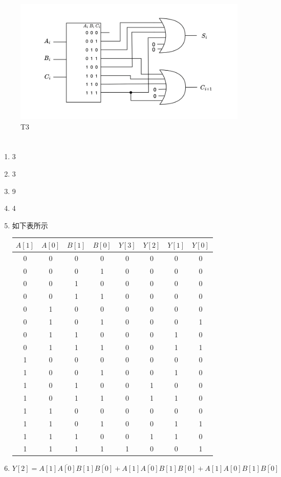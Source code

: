 \documentclass[UTF8]{ctexart}
\begin{document}
\section{}  %
\begin{figure}[h]
  \centering
  \includegraphics[scale=0.3]{p2.png}
  \caption{T3}
\end{figure}
\section{}  %
\begin{enumerate}
  \item 3
  \item 3
  \item 9
  \item 4
  \item 如下表所示
\begin{table}[H]\centering
  \begin{tabular}{cccc|cccc}
    \hline\hline
    $A[1]$ & $A[0]$ & $B[1]$ & $B[0]$ & $Y[3]$ & $Y[2]$ & $Y[1]$ & $Y[0]$ \\
    \hline
    0 & 0 & 0 & 0 & 0 & 0 & 0 & 0 \\
    0 & 0 & 0 & 1 & 0 & 0 & 0 & 0 \\
    0 & 0 & 1 & 0 & 0 & 0 & 0 & 0 \\
    0 & 0 & 1 & 1 & 0 & 0 & 0 & 0 \\
    0 & 1 & 0 & 0 & 0 & 0 & 0 & 0 \\
    0 & 1 & 0 & 1 & 0 & 0 & 0 & 1 \\
    0 & 1 & 1 & 0 & 0 & 0 & 1 & 0 \\
    0 & 1 & 1 & 1 & 0 & 0 & 1 & 1 \\
    1 & 0 & 0 & 0 & 0 & 0 & 0 & 0 \\
    1 & 0 & 0 & 1 & 0 & 0 & 1 & 0 \\
    1 & 0 & 1 & 0 & 0 & 1 & 0 & 0 \\
    1 & 0 & 1 & 1 & 0 & 1 & 1 & 0 \\
    1 & 1 & 0 & 0 & 0 & 0 & 0 & 0 \\
    1 & 1 & 0 & 1 & 0 & 0 & 1 & 1 \\
    1 & 1 & 1 & 0 & 0 & 1 & 1 & 0 \\
    1 & 1 & 1 & 1 & 1 & 0 & 0 & 1 \\
    \hline
  \end{tabular}
\end{table}
  \item
$$Y[2]=A[1]\overline{A[0]}B[1]\overline{B[0]} + A[1]\overline{A[0]}B[1]B[0] + A[1]A[0]B[1]\overline{B[0]}$$
\end{enumerate}
\end{document}
